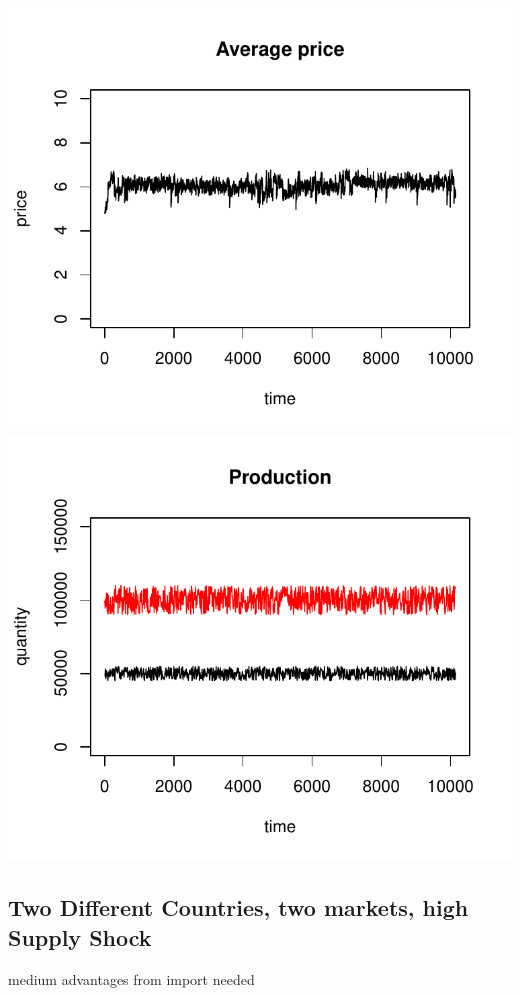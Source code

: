 \documentclass{article}
\begin{document}
\noindent
\vskip-5mm
\hskip-1cm
\includegraphics[scale=0.5]{fig_case04_price}
\includegraphics[scale=0.5]{fig_case04_production}

\newpage

\subsection{Two Different Countries, two markets, high Supply Shock}
medium advantages from import needed
\end{document}
